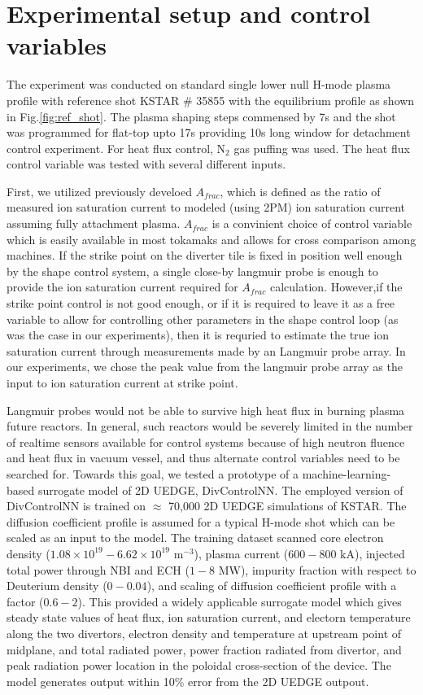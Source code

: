 \section{Experimental setup and control variables}
\label{sec:control_variables}

The experiment was conducted on standard single lower null H-mode plasma profile with reference shot KSTAR \# 35855 with the equilibrium profile as shown in Fig.\ref{fig:ref_shot}.
The plasma shaping steps commensed by 7s and the shot was programmed for flat-top upto 17s providing 10s long window for detachment control experiment.
For heat flux control, N$_2$ gas puffing was used.
The heat flux control variable was tested with several different inputs.

First, we utilized previously develoed $A_{frac}$\cite{Eldon_2022_PPCF}, which is defined as the ratio of measured ion saturation current to modeled (using 2PM\cite{Leonard_2018_PPCF}) ion saturation current assuming fully attachment plasma.
$A_{frac}$ is a convinient choice of control variable which is easily available in most tokamaks and allows for cross comparison among machines.
If the strike point on the diverter tile is fixed in position well enough by the shape control system, a single close-by langmuir probe is enough to provide the ion saturation current required for $A_{frac}$ calculation.
However,if the strike point control is not good enough, or if it is required to leave it as a free variable to allow for controlling other parameters in the shape control loop (as was the case in our experiments), then it is requried to estimate the true ion saturation current through measurements made by an Langmuir probe array.
In our experiments, we chose the peak value from the langmuir probe array as the input to ion saturation current at strike point.

Langmuir probes would not be able to survive high heat flux in burning plasma future reactors.
In general, such reactors would be severely limited in the number of realtime sensors available for control systems because of high neutron fluence and heat flux in vacuum vessel, and thus alternate control variables need to be searched for.
Towards this goal, we tested a prototype of a machine-learning-based surrogate model of 2D UEDGE, DivControlNN.
The employed version of DivControlNN is trained on $\approx$ 70,000 2D UEDGE simulations of KSTAR.
The diffusion coefficient profile is assumed for a typical H-mode shot which can be scaled as an input to the model.
The training dataset scanned core electron density ($1.08 \times 10^{19} - 6.62 \times 10^{19}$ m$^{-3}$), plasma current ($600-800$ kA), injected total power through NBI and ECH ($1-8$ MW), impurity fraction with respect to Deuterium density ($0-0.04$), and scaling of diffusion coefficient profile with a factor ($0.6 - 2$).
This provided a widely applicable surrogate model which gives steady state values of heat flux, ion saturation current, and electorn temperature along the two divertors, electron density and temperature at upstream point of midplane, and total radiated power, power fraction radiated from divertor, and peak radiation power location in the poloidal cross-section of the device.
The model generates output within 10\% error from the 2D UEDGE outpout.

